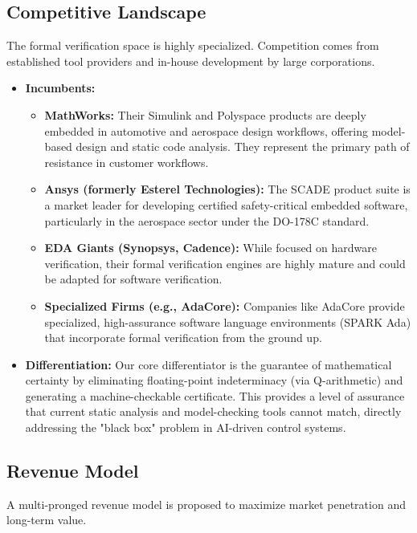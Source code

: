 \documentclass{article}
\begin{document}
\subsection{Competitive Landscape}

The formal verification space is highly specialized. Competition comes from established tool providers and in-house development by large corporations.

\begin{itemize}
    \item \textbf{Incumbents:}
    \begin{itemize}
        \item \textbf{MathWorks:} Their Simulink and Polyspace products are deeply embedded in automotive and aerospace design workflows, offering model-based design and static code analysis. They represent the primary path of resistance in customer workflows.
        \item \textbf{Ansys (formerly Esterel Technologies):} The SCADE product suite is a market leader for developing certified safety-critical embedded software, particularly in the aerospace sector under the DO-178C standard.
        \item \textbf{EDA Giants (Synopsys, Cadence):} While focused on hardware verification, their formal verification engines are highly mature and could be adapted for software verification.
        \item \textbf{Specialized Firms (e.g., AdaCore):} Companies like AdaCore provide specialized, high-assurance software language environments (SPARK Ada) that incorporate formal verification from the ground up.
    \end{itemize}
    \item \textbf{Differentiation:} Our core differentiator is the guarantee of mathematical certainty by eliminating floating-point indeterminacy (via Q-arithmetic) and generating a machine-checkable certificate. This provides a level of assurance that current static analysis and model-checking tools cannot match, directly addressing the "black box" problem in AI-driven control systems.
\end{itemize}

\subsection{Revenue Model}

A multi-pronged revenue model is proposed to maximize market penetration and long-term value.
\end{document}
